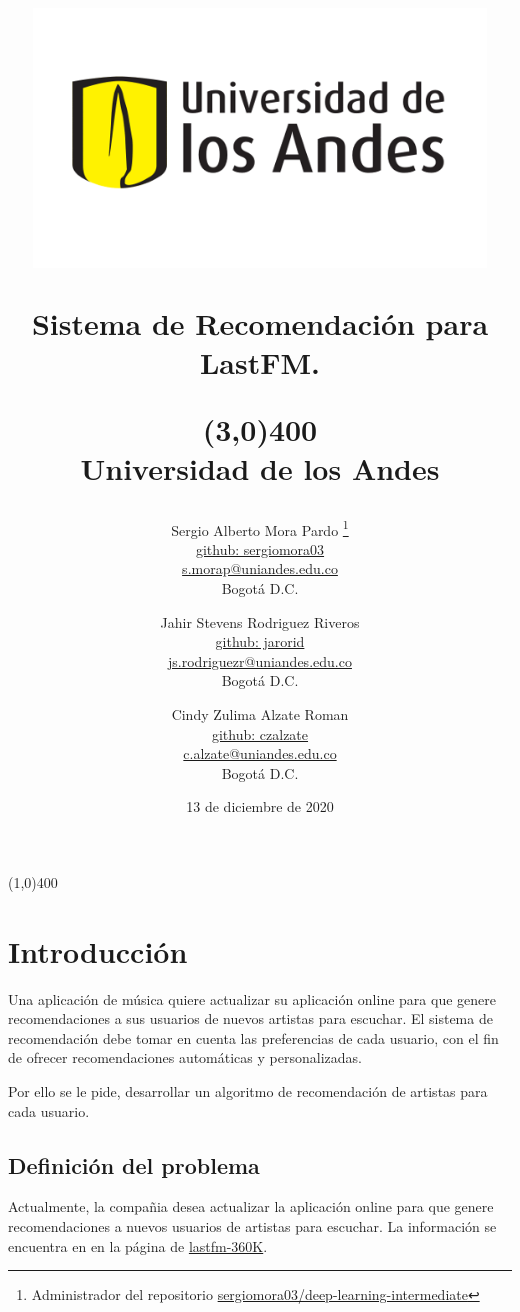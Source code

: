 \documentclass{article}
\title{%
\begin{minipage}{0.3\textwidth}
    \includegraphics[width=0.9\textwidth]{../Micro-Proyecto 2_Sistemas de Recomendacion MusicApp/img/logo-uniandes.png}
\end{minipage}%
    \hfill
\begin{minipage}{0.6\textwidth}
    Sistema de Recomendación para \textbf{LastFM}.
\end{minipage}
\line(3,0){400}\\
\textbf{Universidad de los Andes}
}
\author{
Sergio Alberto Mora Pardo \thanks{Administrador del repositorio \href{https://github.com/sergiomora03/deep-learning-intermediate}{sergiomora03/deep-learning-intermediate}}\\
\small{\href{https://github.com/sergiomora03}{github: sergiomora03}}\\
\small \href{mailto:s.morap@uniandes.edu.co}{s.morap@uniandes.edu.co}\\
\small Bogotá D.C.\\
\and
Jahir Stevens Rodriguez Riveros\\
\small{\href{https://github.com/jarorid}{github: jarorid}}\\
\small \href{mailto:js.rodriguezr@uniandes.edu.co}{js.rodriguezr@uniandes.edu.co}\\
\small Bogotá D.C.\\
\and
Cindy Zulima Alzate Roman\\
\small{\href{https://github.com/czalzate}{github: czalzate}}\\
\small \href{mailto:c.alzate@uniandes.edu.co}{c.alzate@uniandes.edu.co}\\
\small Bogotá D.C.\\
}
\begin{document}
\date{13 de diciembre de 2020}
\maketitle
\line(1,0){400}\\




\section{Introducción}

Una aplicación de música quiere actualizar su aplicación online para que genere recomendaciones a sus usuarios de nuevos artistas para escuchar. El sistema de recomendación debe tomar en cuenta las preferencias de cada usuario, con el fin de ofrecer recomendaciones automáticas y personalizadas.

Por ello se le pide, desarrollar un algoritmo de recomendación de artistas para cada usuario.


\subsection{Definición del problema}

Actualmente, la compañia desea actualizar la aplicación online para que genere recomendaciones a nuevos usuarios de artistas para escuchar. La información se encuentra en \cite{Celma:Springer2010} en la página de \href{http://ocelma.net/MusicRecommendationDataset/lastfm-360K.html}{lastfm-360K}.
\end{document}
